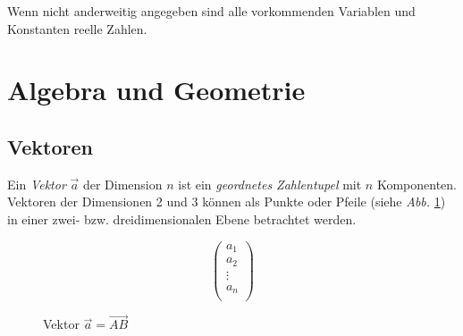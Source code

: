 \documentclass[twocolumn]{article}
\newcommand{\term}[1]{\emph{#1}}
\newcommand{\figref}[1]{\emph{Abb.} \ref{#1}}
\begin{document}
\noindent
Wenn nicht anderweitig angegeben sind alle vorkommenden Variablen und Konstanten reelle Zahlen.

\section{Algebra und Geometrie}

\subsection{Vektoren}

\begin{minipage}[c]{0.78\columnwidth}
Ein \term{Vektor} $\Vec{a}$ der Dimension $n$ ist ein \term{geordnetes Zahlentupel} mit $n$ Komponenten. Vektoren der Dimensionen 2 und 3 können als Punkte oder Pfeile (siehe \figref{fig:vec1}) in einer zwei- bzw. dreidimensionalen Ebene betrachtet werden.
\end{minipage}\hfill
%
\begin{minipage}[c]{0.2\columnwidth}
\vspace*{\fill}
\begin{equation*}
    \begin{pmatrix}
        a_1     \\
        a_2     \\
        \vdots  \\
        a_n     \\
    \end{pmatrix}
\end{equation*}
\vspace*{\fill}
\end{minipage}

\begin{figure}[H]
    \centering

    \caption{Vektor $\Vec{a} = \Vec{AB}$}
    \label{fig:vec1}
\end{figure}
\end{document}
